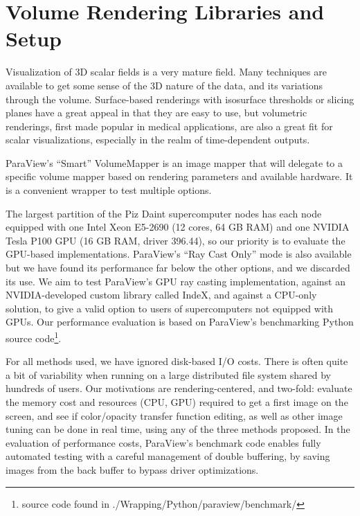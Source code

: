 \documentclass[5p,times]{elsarticle}
\begin{document}
\section{Volume Rendering Libraries and Setup}

Visualization of 3D scalar fields is a very mature field. Many techniques are
available to get some sense of the 3D nature of the data, and its variations
through the volume. Surface-based renderings with isosurface thresholds or
slicing planes have a great appeal in that they are easy to use, but volumetric
renderings, first made popular in medical applications, are also a great fit for
scalar visualizations, especially in the realm of time-dependent outputs.

ParaView's ``Smart'' VolumeMapper is an image mapper
that will delegate to a specific volume mapper based on rendering parameters and
available hardware. It is a convenient
wrapper to test multiple options.

The largest partition of the Piz Daint supercomputer
nodes has each node equipped with one Intel Xeon E5-2690 (12 cores, 64 GB RAM) and one NVIDIA
Tesla P100 GPU (16 GB RAM, driver 396.44), so our priority is to evaluate the GPU-based implementations.
ParaView's ``Ray Cast Only'' mode is also available but we have found its performance far
below the other options, and we discarded its use. We aim to test ParaView's GPU
ray casting implementation, against an NVIDIA-developed custom library called
IndeX, and against a CPU-only solution, to give a valid option to users of
supercomputers not equipped with GPUs.
Our performance evaluation is based on ParaView's benchmarking Python source
code\footnote{source code found in ./Wrapping/Python/paraview/benchmark/}.

For all methods used, we have ignored disk-based I/O costs. There is often quite
a bit of variability when running on a large distributed file system shared by
hundreds of users. Our motivations are rendering-centered, and two-fold:
evaluate the memory cost and resources (CPU, GPU) required to get a first image
on the screen, and see if color/opacity transfer
function editing, as well as other image tuning can be done in real time, using
any of the three methods proposed. In the evaluation of performance costs, ParaView's
benchmark code enables fully automated testing with a careful management of
double buffering, by saving images from the back buffer to bypass driver optimizations.
\end{document}
